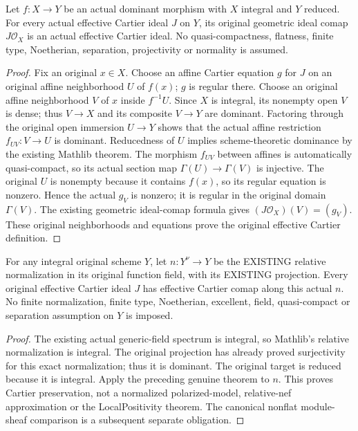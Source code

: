 \begin{lemma}
\label{lem:nonflat-dominant-cartier-comap}
\leanok
{}
Let $f:X\to Y$ be an actual dominant morphism with $X$
integral and $Y$ reduced. For every actual effective Cartier ideal
$J$ on $Y$, its original geometric ideal comap $J\mathcal O_X$ is
an actual effective Cartier ideal. No quasi-compactness, flatness, finite type,
Noetherian, separation, projectivity or normality is assumed.
\end{lemma}
\begin{proof}
Fix an original $x\in X$. Choose an affine Cartier equation $g$ for $J$
on an original affine neighborhood $U$ of $f(x)$; $g$ is regular there.
Choose an original affine neighborhood $V$ of $x$ inside $f^{-1}U$.
Since $X$ is integral, its nonempty open $V$ is dense; thus $V\to X$
and its composite $V\to Y$ are dominant. Factoring through the original
open immersion $U\to Y$ shows that the actual affine restriction
$f_{UV}:V\to U$ is dominant. Reducedness of $U$ implies scheme-theoretic
dominance by the existing Mathlib theorem. The morphism $f_{UV}$ between
affines is automatically quasi-compact, so its actual section map
$\Gamma(U)\to\Gamma(V)$ is injective. The original $U$ is nonempty
because it contains $f(x)$, so its regular equation is nonzero.
Hence the actual $g_V$ is nonzero;
it is regular in the original domain $\Gamma(V)$. The existing geometric
ideal-comap formula gives $(J\mathcal O_X)(V)=(g_V)$. These original
neighborhoods and equations prove the original effective Cartier definition.
\end{proof}

\begin{corollary}
\label{lem:nonflat-normalization-cartier-comap}
\leanok
{}
For any integral original scheme $Y$, let $n:Y^\nu\to Y$ be the EXISTING
relative normalization in its original function field, with its EXISTING
projection. Every original effective Cartier ideal $J$ has effective Cartier
comap along this actual $n$. No finite normalization, finite type,
Noetherian, excellent, field, quasi-compact or separation assumption on $Y$
is imposed.
\end{corollary}
\begin{proof}
The existing actual generic-field spectrum is integral, so Mathlib's
relative normalization is integral. The original projection has already proved surjectivity for this exact normalization; thus it is dominant. The original target is reduced because
it is integral. Apply the preceding genuine theorem to $n$.
This proves Cartier preservation, not a normalized polarized-model,
relative-nef approximation or the LocalPositivity theorem. The canonical
nonflat module-sheaf comparison is a subsequent separate obligation.
\end{proof}
